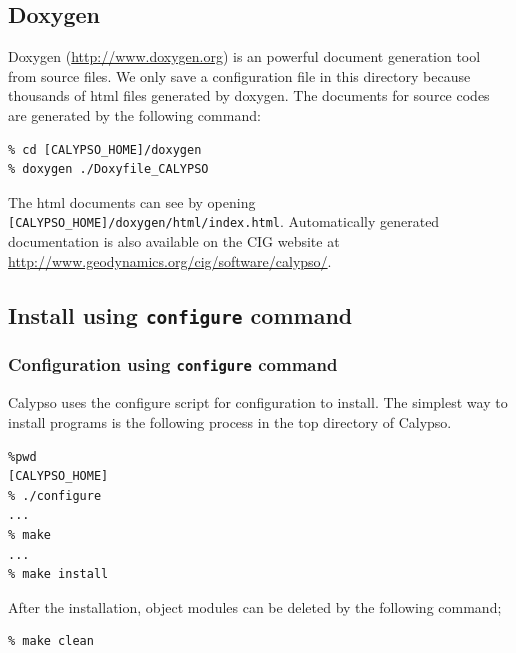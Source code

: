 \subsection{Doxygen}
Doxygen (\url{http://www.doxygen.org}) is an powerful document generation tool from source files. We only save a configuration file in this directory because thousands of html files generated by doxygen. The documents for source codes are generated by the following command:
% 
\begin{verbatim}
% cd [CALYPSO_HOME]/doxygen
% doxygen ./Doxyfile_CALYPSO
\end{verbatim}
%
The html documents can see by opening \verb|[CALYPSO_HOME]/doxygen/html/index.html|.  Automatically generated documentation is also available on the CIG website at \url{http://www.geodynamics.org/cig/software/calypso/}.

\subsection{Install using {\tt configure} command }
\subsubsection{Configuration using {\tt configure} command }
Calypso uses the configure script for configuration to install. The simplest way to install programs is the following process in the top directory of Calypso.
% 
\begin{verbatim}
%pwd
[CALYPSO_HOME]
% ./configure
...
% make
...
% make install
\end{verbatim}
%
After the installation, object modules can be deleted by the following command;
% 
\begin{verbatim}
% make clean
\end{verbatim}
%


